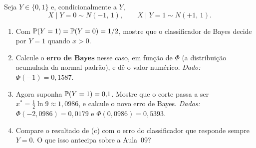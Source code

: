 \documentclass[11pt,a4paper]{article}
\begin{document}

\begin{exercicio}
Seja $Y\in\{0,1\}$ e, condicionalmente a $Y$,
\[
  X\mid Y=0 \sim N(-1,\,1), \qquad X\mid Y=1 \sim N(+1,\,1).
\]
\begin{enumerate}[label=(\alph*),leftmargin=1.1cm]
  \item Com $\mathbb{P}(Y=1)=\mathbb{P}(Y=0)=1/2$, mostre que o classificador de Bayes
        decide por $Y=1$ quando $x>0$.
  \item Calcule o \textbf{erro de Bayes} nesse caso, em função de $\Phi$ (a
        distribuição acumulada da normal padrão), e dê o valor numérico.
        \emph{Dado:} $\Phi(-1)=0{,}1587$.
  \item Agora suponha $\mathbb{P}(Y=1)=0{,}1$. Mostre que o corte passa a ser
        $x^\ast=\tfrac12\ln 9 \approx 1{,}0986$, e calcule o novo erro de Bayes.
        \emph{Dados:} $\Phi(-2{,}0986)=0{,}0179$ e $\Phi(0{,}0986)=0{,}5393$.
  \item Compare o resultado de (c) com o erro do classificador que responde
        sempre $Y=0$. O que isso antecipa sobre a Aula~09?
\end{enumerate}
\end{exercicio}
\end{document}
